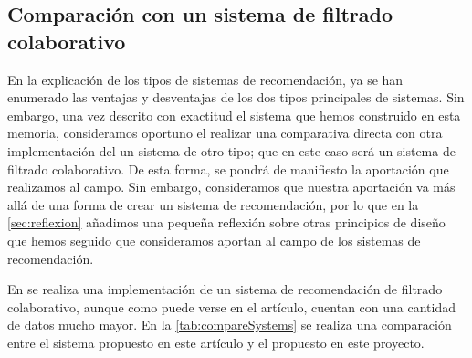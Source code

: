 \subsection{Comparación con un sistema de filtrado colaborativo}

En la explicación de los tipos de sistemas de recomendación, ya se han enumerado las ventajas y desventajas de los dos tipos principales de sistemas. Sin embargo, una vez descrito con exactitud el sistema que hemos construido en esta memoria, consideramos oportuno el realizar una comparativa directa con otra implementación del un sistema de otro tipo; que en este caso será un sistema de filtrado colaborativo. De esta forma, se pondrá de manifiesto la aportación que realizamos al campo. Sin embargo, consideramos que nuestra aportación va más allá de una forma de crear un sistema de recomendación, por lo que en la \autoref{sec:reflexion} añadimos una pequeña reflexión sobre otras principios de diseño que hemos seguido que consideramos aportan al campo de los sistemas de recomendación.

En \cite{ilhami2014film} se realiza una implementación de un sistema de recomendación de filtrado colaborativo, aunque como puede verse en el artículo, cuentan con una cantidad de datos mucho mayor. En la \autoref{tab:compareSystems} se realiza una comparación entre el sistema propuesto en este artículo y el propuesto en este proyecto.

